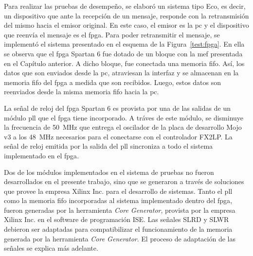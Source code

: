 Para realizar las pruebas de desempeño, se elaboró un sistema tipo Eco, es decir, un dispositivo que ante la recepción de un mensaje, responde con la retransmisión del mismo hacia el emisor original. En este caso, el emisor es la \acrshort{pc} y el dispositivo que reenvía el mensaje es el \acrshort{fpga}. Para poder retransmitir el mensaje, se implementó el sistema presentado en el esquema de la Figura~\ref{test:fpga}. En ella se observa que el \acrshort{fpga} Spartan 6 fue dotado de un bloque con la \acrshort{mef} presentada en el Capítulo anterior. A dicho bloque, fue conectada una memoria \acrshort{fifo}. Así, los datos que son enviados desde la \acrshort{pc}, atraviesan la interfaz y se almacenan en la memoria \acrshort{fifo} del \acrshort{fpga} a medida que son recibidos. Luego, estos datos son reenviados desde la misma memoria \acrshort{fifo} hacia la \acrshort{pc}.

La señal de reloj del \acrshort{fpga} Spartan 6 es provista por una de las salidas de un módulo \acrshort{pll} que el \acrshort{fpga} tiene incorporado. A tráves de este módulo, se disminuye la frecuencia de \SI{50}{\mega\hertz} que entrega el oscilador de la placa de desarrollo Mojo v3 a los \SI{48}{\mega\hertz} necesarios para el conectarse con el controlador FX2LP. La señal de reloj emitida por la salida del \acrshort{pll} sincroniza a todo el sistema implementado en el \acrshort{fpga}. 

Dos de los módulos implementados en el sistema de pruebas no fueron desarrollados en el presente trabajo, sino que se generaron a través de soluciones que provee la empresa Xilinx Inc. para el desarrollo de sistemas. Tanto el \acrshort{pll} como la memoria \acrshort{fifo} incorporadas al sistema implementado dentro del \acrshort{fpga}, fueron generadas por la herramienta \textit{Core Generator}, provista por la empresa Xilinx Inc. en el software de programación ISE. Las señales SLRD y SLWR debieron ser adaptadas para compatibilizar el funcionamiento de la memoria generada por la herramienta \textit{Core Generator}. El proceso de adaptación de las señales se explica más adelante.

